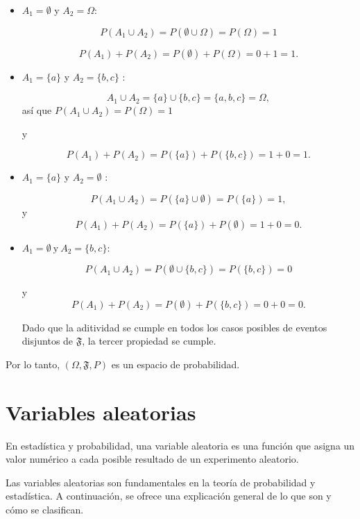 \documentclass[
  us-letterpaper,
]{scrreprt}
\theoremstyle{plain}
\theoremstyle{plain}
\theoremstyle{definition}
\theoremstyle{remark}
\begin{document}
\begin{tcolorbox}
\begin{enumerate}
  \begin{itemize}
  \item
    \(A_1 = \emptyset\) y \(A_2 = \Omega\):

    \[P(A_1 \cup A_2) = P(\emptyset \cup \Omega) = P(\Omega)= 1\]

    \[P(A_1) + P(A_2) = P(\emptyset) + P(\Omega) = 0 + 1 = 1.\]
  \item
    \(A_1 = \{a\}\) y \(A_2 = \{b,c\}\) :

    \[
    A_1 \cup A_2 = \{a\} \cup \{b,c\} = \{a,b,c\} = \Omega,
    \] así que \(P(A_1 \cup A_2) = P(\Omega) = 1\)

    y

    \[P(A_1) + P(A_2) = P(\{a\}) + P(\{b,c\}) = 1+ 0 = 1.\]
  \item
    \(A_1 = \{a\}\) y \(A_2 = \emptyset\) :

    \[
    P(A_1 \cup A_2) = P(\{a\} \cup \emptyset) = P(\{a\}) = 1,
    \] y\[P(A_1) + P(A_2) = P(\{a\}) + P(\emptyset)= 1 + 0 = 0.\]
  \item
    \(A_1 ={\emptyset} \ \text{y}\  A_2 = \{b, c\}:\)

    \[P(A_1 \cup A_2) = P(\emptyset \cup \{b, c\}) = P(\{b, c\}) = 0\]

    y\[P(A_1) + P(A_2) = P(\emptyset) + P(\{b,c\})= 0 + 0 = 0.\]

    Dado que la aditividad se cumple en todos los casos posibles de
    eventos disjuntos de \(\mathfrak{F}\), la tercer propiedad se
    cumple.
  \end{itemize}
\end{enumerate}

Por lo tanto, \((\Omega, \mathfrak{F}, P)\) es un espacio de
probabilidad.

\end{tcolorbox}

\section{Variables aleatorias}\label{variables-aleatorias}

En estadística y probabilidad, una variable aleatoria es una función que
asigna un valor numérico a cada posible resultado de un experimento
aleatorio.

Las variables aleatorias son fundamentales en la teoría de probabilidad
y estadística. A continuación, se ofrece una explicación general de lo
que son y cómo se clasifican.
\end{document}
